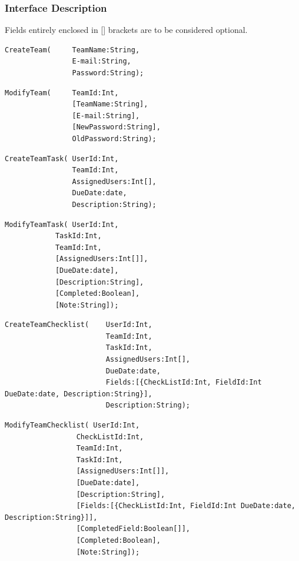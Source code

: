 \documentclass{article}
\begin{document}
\subsubsection{Interface Description}
Fields entirely enclosed in [] brackets are to be considered optional.
\begin{lstlisting}
CreateTeam(     TeamName:String,
                E-mail:String,
                Password:String);
\end{lstlisting}

\begin{lstlisting}
ModifyTeam(     TeamId:Int,
                [TeamName:String],
                [E-mail:String],
                [NewPassword:String],
                OldPassword:String);
\end{lstlisting}

\begin{lstlisting}
CreateTeamTask( UserId:Int,
                TeamId:Int,
                AssignedUsers:Int[],
                DueDate:date,
                Description:String);
\end{lstlisting}

\begin{lstlisting}
ModifyTeamTask( UserId:Int,
            TaskId:Int,
            TeamId:Int,
            [AssignedUsers:Int[]],
            [DueDate:date],
            [Description:String],
            [Completed:Boolean],
            [Note:String]);
\end{lstlisting}

\begin{lstlisting}
CreateTeamChecklist(    UserId:Int,
                        TeamId:Int,
                        TaskId:Int,
                        AssignedUsers:Int[],
                        DueDate:date,
                        Fields:[{CheckListId:Int, FieldId:Int DueDate:date, Description:String}],
                        Description:String);
\end{lstlisting}

\begin{lstlisting}
ModifyTeamChecklist( UserId:Int,
                 CheckListId:Int,
                 TeamId:Int,
                 TaskId:Int,
                 [AssignedUsers:Int[]],
                 [DueDate:date],
                 [Description:String],
                 [Fields:[{CheckListId:Int, FieldId:Int DueDate:date, Description:String}]],
                 [CompletedField:Boolean[]],
                 [Completed:Boolean],
                 [Note:String]);
\end{lstlisting}
\end{document}
